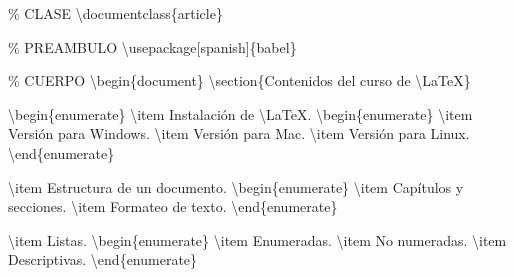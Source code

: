 \documentclass[
  a4paper,
]{scrreport}
\newenvironment{Shaded}{\begin{snugshade}}{\end{snugshade}}
\newcommand{\BuiltInTok}[1]{\textcolor[rgb]{0.00,0.23,0.31}{#1}}
\newcommand{\CommentTok}[1]{\textcolor[rgb]{0.37,0.37,0.37}{#1}}
\newcommand{\ExtensionTok}[1]{\textcolor[rgb]{0.00,0.23,0.31}{#1}}
\newcommand{\FunctionTok}[1]{\textcolor[rgb]{0.28,0.35,0.67}{#1}}
\newcommand{\KeywordTok}[1]{\textcolor[rgb]{0.00,0.23,0.31}{#1}}
\newcommand{\NormalTok}[1]{\textcolor[rgb]{0.00,0.23,0.31}{#1}}
\theoremstyle{definition}
\theoremstyle{remark}
\begin{document}
\begin{tcolorbox}[enhanced jigsaw, left=2mm, colbacktitle=quarto-callout-tip-color!10!white, toprule=.15mm, coltitle=black, leftrule=.75mm, arc=.35mm, colback=white, opacitybacktitle=0.6, rightrule=.15mm, colframe=quarto-callout-tip-color-frame, title=\textcolor{quarto-callout-tip-color}{\faLightbulb}\hspace{0.5em}{Solución}, bottomrule=.15mm, breakable, opacityback=0, bottomtitle=1mm, toptitle=1mm, titlerule=0mm]

\begin{Shaded}
\begin{Highlighting}[]
\CommentTok{\% CLASE}
\BuiltInTok{\textbackslash{}documentclass}\NormalTok{\{}\ExtensionTok{article}\NormalTok{\}}

\CommentTok{\% PREAMBULO}
\BuiltInTok{\textbackslash{}usepackage}\NormalTok{[spanish]\{}\ExtensionTok{babel}\NormalTok{\}}

\CommentTok{\% CUERPO}
\KeywordTok{\textbackslash{}begin}\NormalTok{\{}\ExtensionTok{document}\NormalTok{\}}
\KeywordTok{\textbackslash{}section}\NormalTok{\{Contenidos del curso de }\FunctionTok{\textbackslash{}LaTeX}\NormalTok{\}}

\KeywordTok{\textbackslash{}begin}\NormalTok{\{}\ExtensionTok{enumerate}\NormalTok{\}}
  \FunctionTok{\textbackslash{}item}\NormalTok{ Instalación de }\FunctionTok{\textbackslash{}LaTeX}\NormalTok{.}
  \KeywordTok{\textbackslash{}begin}\NormalTok{\{}\ExtensionTok{enumerate}\NormalTok{\}}
    \FunctionTok{\textbackslash{}item}\NormalTok{ Versión para Windows.}
    \FunctionTok{\textbackslash{}item}\NormalTok{ Versión para Mac.}
    \FunctionTok{\textbackslash{}item}\NormalTok{ Versión para Linux.}
  \KeywordTok{\textbackslash{}end}\NormalTok{\{}\ExtensionTok{enumerate}\NormalTok{\}}

  \FunctionTok{\textbackslash{}item}\NormalTok{ Estructura de un documento.}
  \KeywordTok{\textbackslash{}begin}\NormalTok{\{}\ExtensionTok{enumerate}\NormalTok{\}}
    \FunctionTok{\textbackslash{}item}\NormalTok{ Capítulos y secciones.}
    \FunctionTok{\textbackslash{}item}\NormalTok{ Formateo de texto.}
  \KeywordTok{\textbackslash{}end}\NormalTok{\{}\ExtensionTok{enumerate}\NormalTok{\}}
  
  \FunctionTok{\textbackslash{}item}\NormalTok{ Listas.}
  \KeywordTok{\textbackslash{}begin}\NormalTok{\{}\ExtensionTok{enumerate}\NormalTok{\}}
    \FunctionTok{\textbackslash{}item}\NormalTok{ Enumeradas.}
    \FunctionTok{\textbackslash{}item}\NormalTok{ No numeradas.}
    \FunctionTok{\textbackslash{}item}\NormalTok{ Descriptivas.}
  \KeywordTok{\textbackslash{}end}\NormalTok{\{}\ExtensionTok{enumerate}\NormalTok{\}}
  

\end{Highlighting}
\end{Shaded}
\end{tcolorbox}
\end{document}
